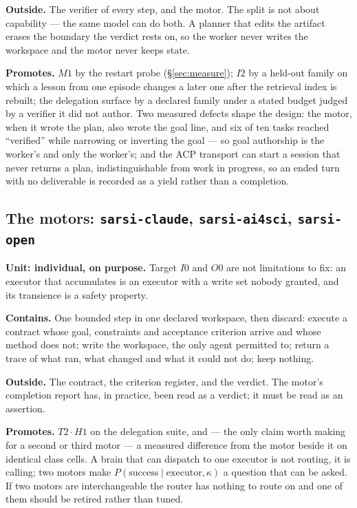 \textbf{Outside.} The verifier of every step, and the motor. The split is not about capability --- the same model can do both. A planner that edits the artifact erases the boundary the verdict rests on, so the worker never writes the workspace and the motor never keeps state.

\textbf{Promotes.} $M1$ by the restart probe (\S\ref{sec:measure}); $I2$ by a held-out family on which a lesson from one episode changes a later one after the retrieval index is rebuilt; the delegation surface by a declared family under a stated budget judged by a verifier it did not author. Two measured defects shape the design: the motor, when it wrote the plan, also wrote the goal line, and six of ten tasks reached ``verified'' while narrowing or inverting the goal --- so goal authorship is the worker's and only the worker's; and the ACP transport can start a session that never returns a plan, indistinguishable from work in progress, so an ended turn with no deliverable is recorded as a yield rather than a completion.

\subsection{The motors: \texttt{sarsi-claude}, \texttt{sarsi-ai4sci}, \texttt{sarsi-open}}\label{sec:motoragents}

\textbf{Unit: individual, on purpose.} Target $I0$ and $O0$ are not limitations to fix: an executor that accumulates is an executor with a write set nobody granted, and its transience is a safety property.

\textbf{Contains.} One bounded step in one declared workspace, then discard: execute a contract whose goal, constraints and acceptance criterion arrive and whose method does not; write the workspace, the only agent permitted to; return a trace of what ran, what changed and what it could not do; keep nothing.

\textbf{Outside.} The contract, the criterion register, and the verdict. The motor's completion report has, in practice, been read as a verdict; it must be read as an assertion.

\textbf{Promotes.} $T2\cdot H1$ on the delegation suite, and --- the only claim worth making for a second or third motor --- a measured difference from the motor beside it on identical class cells. A brain that can dispatch to one executor is not routing, it is calling; two motors make $P(\text{success}\mid\text{executor},\kappa)$ a question that can be asked. If two motors are interchangeable the router has nothing to route on and one of them should be retired rather than tuned.

